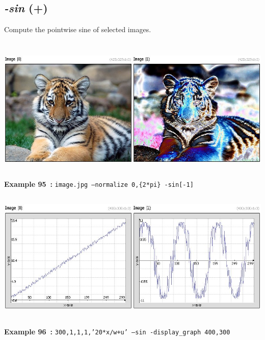 \documentclass[a4paper,11pt,twoside]{book}
\begin{document}
\subsection{\emph{-sin} (+)}\vspace*{-0.5em}
Compute the pointwise sine of selected images.
\begin{center}\includegraphics[keepaspectratio=true,height=7cm,width=\textwidth]{img/gmic_def95.jpg}\\
{\footnotesize \textbf{Example 95~:} \texttt{image.jpg --normalize 0,\{2*pi\} -sin[-1]}}
\\\includegraphics[keepaspectratio=true,height=7cm,width=\textwidth]{img/gmic_def96.jpg}\\
{\footnotesize \textbf{Example 96~:} \texttt{300,1,1,1,'20*x/w+u' --sin -display\_graph 400,300}}
\end{center}
\end{document}
